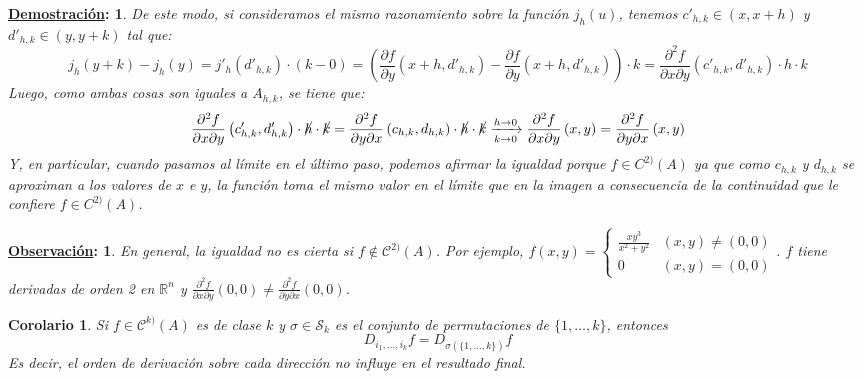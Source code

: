 \documentclass[10pt,a4paper,openright]{book}
\theoremstyle{break}
\newtheorem*{coro}{Corolario}
\newtheorem*{demo}{\underline{Demostración}:}
\newtheorem*{obs}{\underline{Observación}:}
\begin{document}
\begin{demo}
De este modo, si consideramos el mismo razonamiento sobre la función $j_h(u)$, tenemos $c'_{h,k}\in (x, x+h)$ y $d'_{h,k}\in (y, y+k)$ tal que:
$$j_h(y+k) - j_h (y) = j'_h(d'_{h,k}) \cdot (k-0) = \left( \frac{\partial f}{\partial y}\left(x + h, d'_{h,k}\right) - \frac{\partial f}{\partial y}\left(x+h, d'_{h,k}\right)\right) \cdot k = \frac{\partial^{2}f}{\partial x \partial y}\left(c'_{h,k}, d'_{h,k}\right) \cdot h \cdot k$$
Luego, como ambas cosas son iguales a $A_{h,k}$, se tiene que:
$$\frac{\partial^{2}f}{\partial x \partial y}\left(c'_{h,k}, d'_{h,k}\right) \cdot \cancel{h} \cdot \cancel{k} = \frac{\partial^{2}f}{\partial y \partial x}\left(c_{h,k}, d_{h,k}\right) \cdot \cancel{h} \cdot \cancel{k} \xrightarrow[k\rightarrow 0]{h\rightarrow 0} \frac{\partial^{2}f}{\partial x \partial y}\left(x,y \right)= \frac{\partial^{2}f}{\partial y \partial x}\left( x,y\right) $$
Y, en particular, cuando pasamos al límite en el último paso, podemos afirmar la igualdad porque $f\in C^{2)}(A)$ ya que como $c_{h,k}$ y $d_{h,k}$ se aproximan a los valores de $x$ e $y$, la función toma el mismo valor en el límite que en la imagen a consecuencia de la continuidad que le confiere $f\in C^{2)}(A)$.
\end{demo}

\begin{obs}
En general, la igualdad no es cierta si $f \notin \mathcal{C}^{2)} (A)$. Por ejemplo, $f(x,y) = \begin{cases} \frac{xy^3}{x^2 + y^2} & (x,y) \neq (0,0) \\ 0 & (x,y) = (0,0) \end{cases}$. $f$ tiene derivadas de orden 2 en $\mathbb{R}^n$ y $\frac{\partial^2 f }{\partial x \partial y} (0,0) \neq \frac{\partial^2 f }{ \partial y\partial x} (0,0)$.
\end{obs}

\begin{coro}
Si $f \in \mathcal{C}^{k)} (A)$ es de clase $k$ y $\sigma \in \mathcal{S}_k$ es el conjunto de permutaciones de $\{1, \ldots, k\}$, entonces 
$$D_{i_1, \ldots, i_k} f = D_{\sigma (\{1, \ldots, k\})} f$$
Es decir, el orden de derivación sobre cada dirección no influye en el resultado final.
\end{coro}
\end{document}
